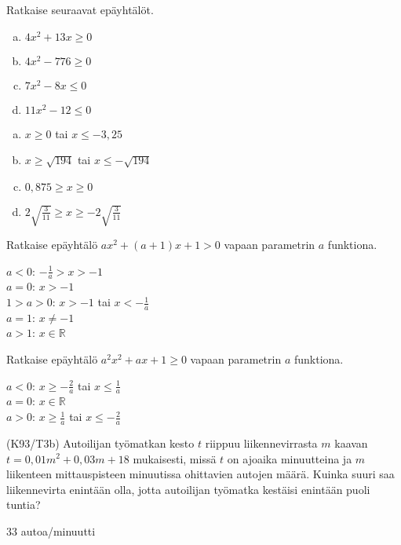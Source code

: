 \begin{tehtava}
    Ratkaise seuraavat epäyhtälöt.
    \begin{enumerate}[(a)]
        \item $4x^2+13x\geq 0$
        \item $4x^2-776\geq 0$
        \item $7x^2-8x\leq 0$
        \item $11x^2-12\leq 0$
    \end{enumerate}
    \begin{vastaus}
        \begin{enumerate}[(a)]
            \item $x \geq 0$ tai $x \leq -3,25$
            \item $x \geq \sqrt{194}$ tai $x \leq -\sqrt{194}$
            \item $0,875 \geq x \geq 0$
            \item $2\sqrt{\frac{3}{11}} \geq x \geq -2\sqrt{\frac{3}{11}}$
        \end{enumerate}
    \end{vastaus}
\end{tehtava}

\begin{tehtava}
    Ratkaise epäyhtälö $ax^2+(a+1)x+1 > 0$ vapaan parametrin $a$ funktiona.
    \begin{vastaus}
        $a < 0$: $-\frac{1}{a} > x > -1$ \\ $a = 0$: $x > -1$ \\ $1 > a > 0$: $x > -1$ tai $x < -\frac{1}{a}$ \\ $a = 1$: $x \neq -1$ \\ $a > 1$: $x \in \mathbb{R}$
    \end{vastaus}
\end{tehtava}

\begin{tehtava}
    Ratkaise epäyhtälö $a^2x^2+ax+1 \geq 0$ vapaan parametrin $a$ funktiona.
    \begin{vastaus}
        $a < 0$: $x \geq -\frac{2}{a}$ tai $x \leq \frac{1}{a}$ \\ $a = 0$: $x \in \mathbb{R} $ \\ $a > 0$: $x \geq \frac{1}{a}$ tai $x \leq -\frac{2}{a}$
    \end{vastaus}
\end{tehtava}


\begin{tehtava}
(K93/T3b) Autoilijan työmatkan kesto $t$ riippuu liikennevirrasta $m$ kaavan 
        $t=0,01m^2+0,03m+18$ mukaisesti, missä $t$ on ajoaika minuutteina ja $m$ liikenteen mittauspisteen minuutissa ohittavien autojen määrä. Kuinka suuri saa liikennevirta enintään olla, jotta autoilijan työmatka kestäisi enintään puoli tuntia?
\begin{vastaus}
        $33$ autoa/minuutti
    \end{vastaus}
\end{tehtava}
